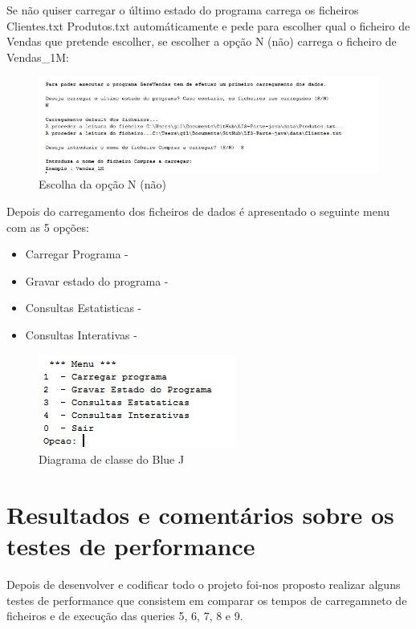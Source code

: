 Se não quiser carregar o último estado do programa carrega os ficheiros Clientes.txt Produtos.txt automáticamente e pede para escolher qual o ficheiro de Vendas que pretende escolher, se escolher a opção N (não) carrega o ficheiro de Vendas\_1M: 

\begin{figure}[h!]
	\includegraphics[scale=0.65]{menunao.jpg}  
	\caption{Escolha da opção N (não) }  
\end{figure}

Depois do carregamento dos ficheiros de dados é apresentado o seguinte menu com as 5 opções: 

\begin{itemize}
	\item Carregar Programa - 
	\item Gravar estado do programa - 
	\item Consultas Estatisticas - 
	\item Consultas Interativas  - 
\end{itemize}
	
	
	
\begin{figure}[h!]
	\includegraphics[scale=1.5]{MenuInicial.jpg}  
	\caption{Diagrama de classe do Blue J }  
\end{figure}

\chapter{Resultados e comentários sobre os testes de performance}

Depois de desenvolver e codificar todo o projeto foi-nos proposto realizar alguns testes de performance que consistem em comparar os tempos de carregamneto de ficheiros e de execução das queries 5, 6, 7, 8 e 9.

